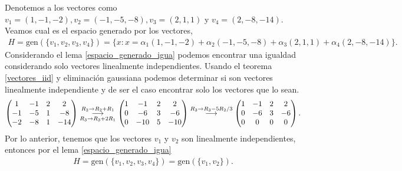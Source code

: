 \documentclass[11pt,letterpaper]{article}
\newcommand{\grstep}[2][\relax]{%
   \ensuremath{\mathrel{
       {\mathop{\longrightarrow}\limits^{#2\mathstrut}_{
                                     \begin{subarray}{l} #1 \end{subarray}}}}}}
\newcommand{\gen}{\text{gen}}
\begin{document}
\begin{enumerate}
Denotemos a los vectores como $v_1=(1, -1, -2), v_2=(-1, -5, -8), v_3=(2, 1, 1)$ y $v_4=(2, -8, -14)$. Veamos cual es el espacio generado por los vectores,
\begin{align*}
H=\gen(\{v_1,v_2,v_3,v_4\})=\{ x:x=\alpha_1(1, -1, -2)+\alpha_2(-1, -5, -8)+\alpha_3(2, 1, 1)+\alpha_4(2, -8, -14) \}.
\end{align*}
Considerando el lema \ref{espacio_generado_igua} podemos encontrar una igualdad considerando solo vectores linealmente independientes. Usando el teorema  \ref{vectores_iid} y eliminación gaussiana podemos determinar si son vectores linealmente independiente y de ser el caso encontrar solo los vectores que lo sean.
\begin{align}\label{A_invertible}
\begin{pmatrix}
 1 & -1 & 2 & 2 \\
-1 & -5 & 1 & -8\\
-2 & -8 & 1 & -14
\end{pmatrix}%
\grstep[R_3\rightarrow R_3+2R_1]{R_2 \rightarrow R_2+R_1}
%
\begin{pmatrix}
 1 & -1 & 2 & 2 \\
 0 & -6 & 3 & -6\\
 0 & -10& 5 & -10
\end{pmatrix}%
\grstep[]{R_3 \rightarrow R_3-5R_2/3}
%
\begin{pmatrix}
 1 & -1 & 2 & 2 \\
 0 & -6 & 3 & -6\\
 0 &  0 & 0 & 0
\end{pmatrix}.
\end{align}
Por lo anterior, tenemos que los vectores $v_1$ y  $v_2$ son linealmente independientes, entonces por el lema \ref{espacio_generado_igua}
\begin{align*}
H=\gen(\{v_1,v_2,v_3,v_4\})=\gen(\{v_1,v_2\}).
\end{align*}


\end{enumerate}
\end{document}
